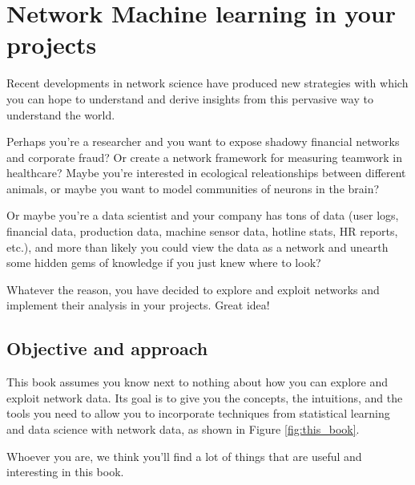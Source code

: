 \section*{Network Machine learning in your projects}

Recent developments in network science have produced new strategies with which you can hope to understand and derive insights from this pervasive way to understand the world. 

Perhaps you're a researcher and you want to expose shadowy financial networks and corporate fraud? Or create a network framework for measuring teamwork in healthcare? Maybe you're interested in ecological releationships between different animals, or maybe you want to model communities of neurons in the brain?

Or maybe you're a data scientist and your company has tons of data (user logs, financial data, production data, machine sensor data, hotline stats, HR reports, etc.), and more than likely you could view the data as a network and unearth some hidden gems of knowledge if you just knew where to look?

Whatever the reason, you have decided to explore and exploit networks and implement their analysis in your projects. Great idea!

\subsection*{Objective and approach}
This book assumes you know next to nothing about how you can explore and exploit network data. Its goal is to give you the concepts, the intuitions, and the tools you need to allow you to incorporate techniques from statistical learning and data science with network data, as shown in Figure \ref{fig:this_book}.

Whoever you are, we think you'll find a lot of things that are useful and interesting in this book.


